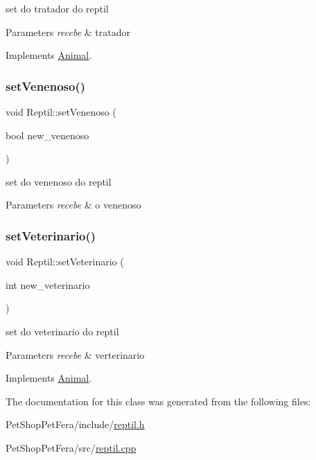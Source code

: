 set do tratador do reptil 


\begin{DoxyParams}{Parameters}
{\em recebe} & tratador \\
\hline
\end{DoxyParams}


Implements \mbox{\hyperlink{class_animal}{Animal}}.

\mbox{\label{class_reptil_aad9caa07677609d1c6594b71e1d55747}} 
\subsubsection{\texorpdfstring{setVenenoso()}{setVenenoso()}}
{\footnotesize\ttfamily void Reptil\+::set\+Venenoso (\begin{DoxyParamCaption}\item[{bool}]{new\+\_\+venenoso }\end{DoxyParamCaption})}



set do venenoso do reptil 


\begin{DoxyParams}{Parameters}
{\em recebe} & o venenoso \\
\hline
\end{DoxyParams}
\mbox{\label{class_reptil_aed6f276b87e0515d73a4788c812db379}} 
\subsubsection{\texorpdfstring{setVeterinario()}{setVeterinario()}}
{\footnotesize\ttfamily void Reptil\+::set\+Veterinario (\begin{DoxyParamCaption}\item[{int}]{new\+\_\+veterinario }\end{DoxyParamCaption})\hspace{0.3cm}{\ttfamily [virtual]}}



set do veterinario do reptil 


\begin{DoxyParams}{Parameters}
{\em recebe} & verterinario \\
\hline
\end{DoxyParams}


Implements \mbox{\hyperlink{class_animal}{Animal}}.



The documentation for this class was generated from the following files\+:\begin{DoxyCompactItemize}
\item 
Pet\+Shop\+Pet\+Fera/include/\mbox{\hyperlink{reptil_8h}{reptil.\+h}}\item 
Pet\+Shop\+Pet\+Fera/src/\mbox{\hyperlink{reptil_8cpp}{reptil.\+cpp}}\end{DoxyCompactItemize}
